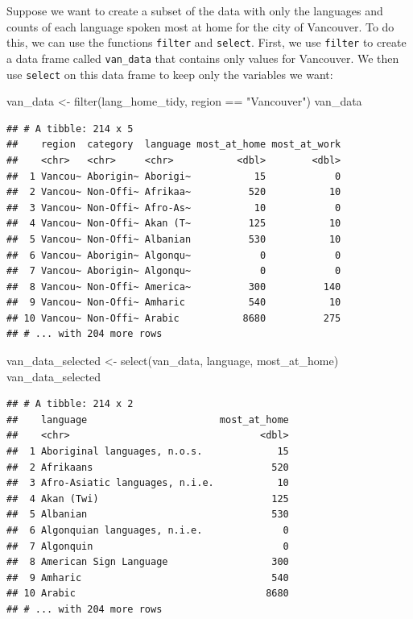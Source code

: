 \documentclass[
]{krantz}
\makeatletter
\newenvironment{Shaded}{\begin{snugshade}}{\end{snugshade}}
\newcommand{\FunctionTok}[1]{\textcolor[rgb]{0,0,0}{#1}}
\newcommand{\NormalTok}[1]{#1}
\newcommand{\OtherTok}[1]{\textcolor[rgb]{0.37,0.37,0.37}{#1}}
\newcommand{\SpecialCharTok}[1]{\textcolor[rgb]{0,0,0}{#1}}
\newcommand{\StringTok}[1]{\textcolor[rgb]{0.5,0.5,0.5}{#1}}
\newenvironment{kframe}{%
\medskip{}
\setlength{\fboxsep}{.8em}
 \def\at@end@of@kframe{}%
 \ifinner\ifhmode%
  \def\at@end@of@kframe{\end{minipage}}%
  \begin{minipage}{\columnwidth}%
 \fi\fi%
 \def\FrameCommand##1{\hskip\@totalleftmargin \hskip-\fboxsep
 \colorbox{shadecolor}{##1}\hskip-\fboxsep
     \hskip-\linewidth \hskip-\@totalleftmargin \hskip\columnwidth}%
 \MakeFramed {\advance\hsize-\width
   \@totalleftmargin\z@ \linewidth\hsize
   \@setminipage}}%
 {\par\unskip\endMakeFramed%
 \at@end@of@kframe}
\renewenvironment{Shaded}{\begin{kframe}}{\end{kframe}}
\makeatother
\begin{document}
Suppose we want to create a subset of the data with only the languages and counts of each language spoken most at home for the city of Vancouver. To do this, we can use the functions \texttt{filter} and \texttt{select}. First, we use \texttt{filter} to create a data frame called \texttt{van\_data} that contains only values for Vancouver. We then use \texttt{select} on this data frame to keep only the variables we want:

\begin{Shaded}
\begin{Highlighting}[]
\NormalTok{van\_data }\OtherTok{\textless{}{-}} \FunctionTok{filter}\NormalTok{(lang\_home\_tidy, region }\SpecialCharTok{==} \StringTok{"Vancouver"}\NormalTok{)}
\NormalTok{van\_data}
\end{Highlighting}
\end{Shaded}

\begin{verbatim}
## # A tibble: 214 x 5
##    region  category  language most_at_home most_at_work
##    <chr>   <chr>     <chr>           <dbl>        <dbl>
##  1 Vancou~ Aborigin~ Aborigi~           15            0
##  2 Vancou~ Non-Offi~ Afrikaa~          520           10
##  3 Vancou~ Non-Offi~ Afro-As~           10            0
##  4 Vancou~ Non-Offi~ Akan (T~          125           10
##  5 Vancou~ Non-Offi~ Albanian          530           10
##  6 Vancou~ Aborigin~ Algonqu~            0            0
##  7 Vancou~ Aborigin~ Algonqu~            0            0
##  8 Vancou~ Non-Offi~ America~          300          140
##  9 Vancou~ Non-Offi~ Amharic           540           10
## 10 Vancou~ Non-Offi~ Arabic           8680          275
## # ... with 204 more rows
\end{verbatim}

\begin{Shaded}
\begin{Highlighting}[]
\NormalTok{van\_data\_selected }\OtherTok{\textless{}{-}} \FunctionTok{select}\NormalTok{(van\_data, language, most\_at\_home)}
\NormalTok{van\_data\_selected}
\end{Highlighting}
\end{Shaded}

\begin{verbatim}
## # A tibble: 214 x 2
##    language                       most_at_home
##    <chr>                                 <dbl>
##  1 Aboriginal languages, n.o.s.             15
##  2 Afrikaans                               520
##  3 Afro-Asiatic languages, n.i.e.           10
##  4 Akan (Twi)                              125
##  5 Albanian                                530
##  6 Algonquian languages, n.i.e.              0
##  7 Algonquin                                 0
##  8 American Sign Language                  300
##  9 Amharic                                 540
## 10 Arabic                                 8680
## # ... with 204 more rows
\end{verbatim}
\end{document}
